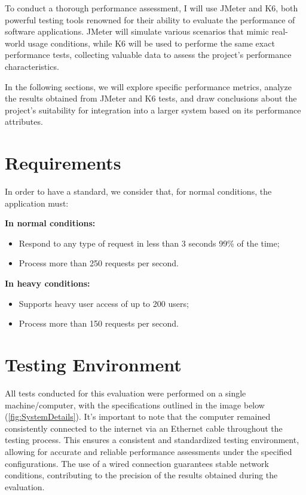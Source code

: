 \documentclass[a4paper,11pt,openright,BCOR=15mm]{scrbook}
\begin{document}
To conduct a thorough performance assessment, I will use JMeter and K6, both powerful testing tools renowned for their ability to evaluate the performance of software applications. JMeter will simulate various scenarios that mimic real-world usage conditions, while K6 will be used to performe the same exact performance tests, collecting valuable data to assess the project’s performance characteristics.

In the following sections, we will explore specific performance metrics, analyze the results obtained from JMeter and K6 tests, and draw conclusions about the project’s suitability for integration into a larger system based on its performance attributes.

  \section{Requirements}

In order to have a standard, we consider that, for normal conditions, the application
must:


\textbf{In normal conditions:}
		\begin{itemize}
			\item Respond to any type of request in less than 3 seconds 99\% of the time;
			\item Process more than 250 requests per second.
		\end{itemize}
		
	\textbf{In heavy conditions:}
		\begin{itemize}
			\item Supports heavy user access of up to 200 users;
			\item Process more than 150 requests per second.
		\end{itemize}


  \section{Testing Environment}
  All tests conducted for this evaluation were performed on a single machine/computer, with the specifications outlined in the image below (\ref{fig:SystemDetails}). It's important to note that the computer remained consistently connected to the internet via an Ethernet cable throughout the testing process. This ensures a consistent and standardized testing environment, allowing for accurate and reliable performance assessments under the specified configurations. The use of a wired connection guarantees stable network conditions, contributing to the precision of the results obtained during the evaluation.
  
\end{document}

